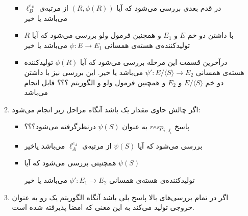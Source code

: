 \begin{itemize}
\begin{enumerate}
{\begin{itemize}
		\item {
		در قدم بعدی بررسی می‌شود که آیا
		$(R,\phi(R))$
		از مرتبه‌ی
		$\ell_B^{e_B}$
		می‌باشد یا خیر
		}
		\item {
		با داشتن دو خم 
		$E$
		و
		$E_1$
		و همچنین فرمول ولو بررسی می‌شود که آیا 
		$R$
		تولیدکننده‌ی هسته‌ی همسانی
		$\psi : E \rightarrow E_1$
		می‌باشد یا خیر
		}
	
		\item {
			درآخرین قسمت این مرحله بررسی می‌شود که آیا
		$\phi(R)$
		تولیدکننده هسته‌ی همسانی
		${\psi}' : E / \langle S \rangle \rightarrow E_2$
		می‌باشد یا خیر. این بررسی نیز با داشتن دو خم 
		$E / \langle S \rangle$
		و
		$E_2$
		و همچنین فرمول ولو و  الگوریتم ؟؟؟ قابل انجام می‌باشد
		
		}
	\end{itemize}		
	}

	\item {
	اگر چالش حاوی مقدار یک باشد آنگاه مراحل زیر انجام می‌شود:
	\begin{itemize}
		\item {
		پاسخ 
		$resp_{i,J_i}$
		به عنوان 
		$\psi(S)$
		درنظرگرفته می‌شود؟؟؟
		}
	
		\item {
		بررسی می‌شود که آیا
		$\psi(S)$
		از مرتبه‌ی
		$\ell_A^{e_A}$
		می‌باشد یاخیر
		}
	
		\item {
		همچنینی بررسی می‌شود که آیا 
		$\psi(S)$
		
		تولیدکننده‌ی هسته‌ی همسانی
		${\phi}' :‌E_1 \rightarrow E_2$
		می‌باشد یا خیر
		}
	\end{itemize}
	}

	\item {
	اگر در تمام بررسی‌های بالا پاسخ بلی باشد آنگاه الگوریتم یک رو به عنوان خروجی تولید می‌کند به این معنی که امضا پذیرفته شده است.
	}
\end{enumerate}
\end{itemize}